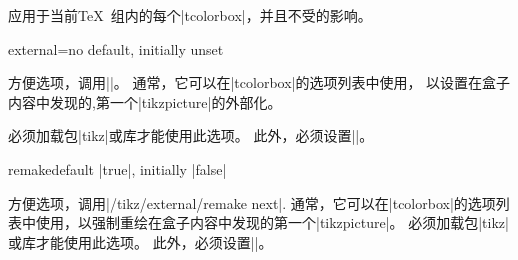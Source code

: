   

\begin{marker}
  应用于当前\TeX\ 组内的每个|tcolorbox|，并且不受的影响。
  \end{marker}
  
  \begin{docTcbKey}{external}{=}{no default, initially unset}
  
  方便选项，调用||。%
  通常，它可以在|tcolorbox|的选项列表中使用，%
  以设置在盒子内容中发现的,第一个|tikzpicture|的外部化。%
  
  
  必须加载包|tikz|或库才能使用此选项。%
  此外，必须设置|\usetikzlibrary{external}|。
  \end{docTcbKey}



\begin{docTcbKey}{remake}{}{default |true|, initially |false|}

方便选项，调用|/tikz/external/remake next|. %
通常，它可以在|tcolorbox|的选项列表中使用，以强制重绘在盒子内容中发现的第一个|tikzpicture|。%
必须加载包|tikz|或库才能使用此选项。%
此外，必须设置|\usetikzlibrary{external}|。
\end{docTcbKey}




